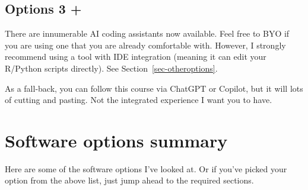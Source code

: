 \documentclass[
  letterpaper,
  DIV=11,
  numbers=noendperiod]{scrreprt}
\begin{document}
\subsection{Options 3 +}\label{options-3}

There are innumerable AI coding assistants now available. Feel free to
BYO if you are using one that you are already comfortable with. However,
I strongly recommend using a tool with IDE integration (meaning it can
edit your R/Python scripts directly). See
Section~\ref{sec-otheroptions}.

As a fall-back, you can follow this course via ChatGPT or Copilot, but
it will lots of cutting and pasting. Not the integrated experience I
want you to have.

\section{Software options summary}\label{software-options-summary}

Here are some of the software options I've looked at. Or if you've
picked your option from the above list, just jump ahead to the required
sections.
\end{document}
